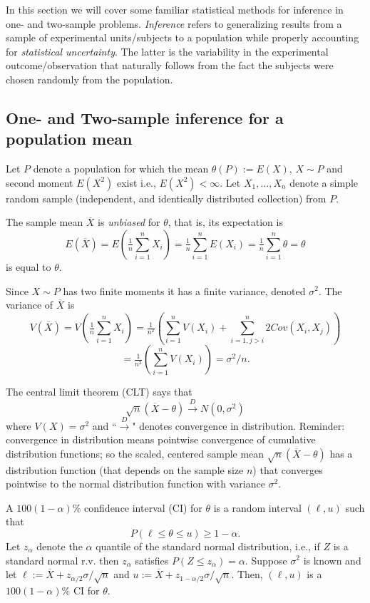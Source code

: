 \documentclass[]{book}
\begin{document}
In this section we will cover some familiar statistical methods for
inference in one- and two-sample problems. \emph{Inference} refers to
generalizing results from a sample of experimental units/subjects to a
population while properly accounting for \emph{statistical uncertainty}.
The latter is the variability in the experimental outcome/observation
that naturally follows from the fact the subjects were chosen randomly
from the population.

\subsection{One- and Two-sample inference for a population
mean}\label{one--and-two-sample-inference-for-a-population-mean}

Let \(P\) denote a population for which the mean
\(\theta(P):=E(X), \,X\sim P\) and second moment \(E(X^2)\) exist i.e.,
\(E(X^2)<\infty\). Let \(X_1, \ldots, X_n\) denote a simple random
sample (independent, and identically distributed collection) from \(P\).

The sample mean \(\overline{X}\) is \emph{unbiased} for \(\theta\), that
is, its expectation is
\[E(\overline X) = E\left(\tfrac1n \sum_{i=1}^n X_i\right) = \tfrac1n \sum_{i=1}^n E(X_i) = \tfrac1n \sum_{i=1}^n \theta = \theta\]
is equal to \(\theta\).

Since \(X\sim P\) has two finite moments it has a finite variance,
denoted \(\sigma^2\). The variance of \(\overline X\) is
\[V(\overline X) = V\left(\tfrac1n \sum_{i=1}^n X_i\right) = \tfrac{1}{n^2}\left(\sum_{i=1}^n V(X_i) + \sum_{i=1, j>i}^n 2Cov(X_i, X_j)\right)\]
\[ = \tfrac{1}{n^2}\left(\sum_{i=1}^n V(X_i)\right) = \sigma^2/n.\]

The central limit theorem (CLT) says that
\[\sqrt n(\overline{X} - \theta) \stackrel{D}{\rightarrow} N(0, \sigma^2)\]
where \(V(X) =\sigma^2\) and ``\(\stackrel{D}{\rightarrow}\)" denotes
convergence in distribution. Reminder: convergence in distribution means
pointwise convergence of cumulative distribution functions; so the
scaled, centered sample mean \(\sqrt n(\overline{X} - \theta)\) has a
distribution function (that depends on the sample size \(n\)) that
converges pointwise to the normal distribution function with variance
\(\sigma^2\).

A \(100(1-\alpha)\%\) confidence interval (CI) for \(\theta\) is a
random interval \((\ell, u)\) such that
\[P(\ell \leq \theta \leq u) \geq 1-\alpha.\] Let \(z_\alpha\) denote
the \(\alpha\) quantile of the standard normal distribution, i.e., if
\(Z\) is a standard normal r.v. then \(z_\alpha\) satisfies
\(P(Z\leq z_\alpha) = \alpha\). Suppose \(\sigma^2\) is known and let
\(\ell := \overline{X} + z_{\alpha/2}\sigma/\sqrt{n}\) and
\(u := \overline{X} + z_{1-\alpha/2}\sigma/\sqrt{n}\). Then,
\((\ell, u)\) is a \(100(1-\alpha)\%\) CI for \(\theta\).
\end{document}

